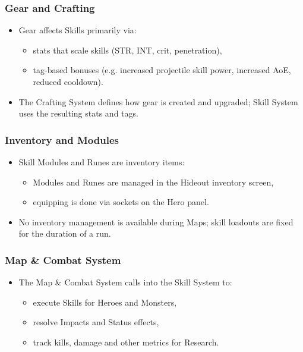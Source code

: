 \subsubsection*{Gear and Crafting}

\begin{itemize}
	\item Gear affects Skills primarily via:
	\begin{itemize}
		\item stats that scale skills (STR, INT, crit, penetration),
		\item tag-based bonuses (e.g. increased projectile skill power, increased AoE, reduced cooldown).
	\end{itemize}
	\item The Crafting System defines how gear is created and upgraded; Skill System uses the resulting stats and tags.
\end{itemize}

\subsubsection*{Inventory and Modules}

\begin{itemize}
	\item Skill Modules and Runes are inventory items:
	\begin{itemize}
		\item Modules and Runes are managed in the Hideout inventory screen,
		\item equipping is done via sockets on the Hero panel.
	\end{itemize}
	\item No inventory management is available during Maps; skill loadouts are fixed for the duration of a run.
\end{itemize}

\subsubsection*{Map \& Combat System}

\begin{itemize}
	\item The Map \& Combat System calls into the Skill System to:
	\begin{itemize}
		\item execute Skills for Heroes and Monsters,
		\item resolve Impacts and Status effects,
		\item track kills, damage and other metrics for Research.
	\end{itemize}
\end{itemize}

